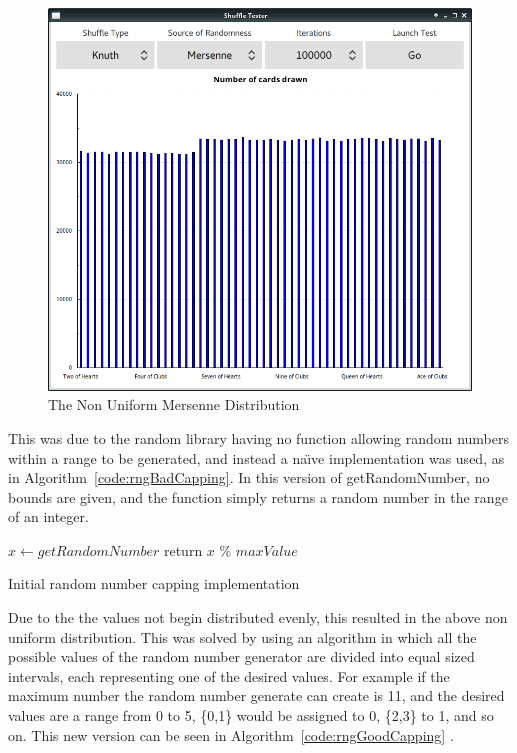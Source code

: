 \begin{figure}[H]
    \centering
    \includegraphics[width=0.8\linewidth]{../images/faultymersenne.png}
    \caption{The Non Uniform Mersenne Distribution}%
    \label{fig:faultymersenne}
\end{figure}

This was due to the random library having no function allowing random numbers
within a range to be generated, and instead a na\"{\i}ve implementation was
used, as in Algorithm~\ref{code:rngBadCapping}. In this version of
getRandomNumber, no bounds are given, and the function simply returns a
random number in the range of an integer.

\vspace{0.3cm}

\begin{algorithm}[H]
    \BlankLine{}
     $x \leftarrow getRandomNumber$\;
     return $x$ \% $maxValue$\;
\caption{Initial random number capping implementation}%
\label{code:rngBadCapping}
\end{algorithm}

\vspace{0.3cm}

Due to the the values not begin distributed evenly, this resulted in the
above non uniform distribution. This was solved by using an algorithm in which
all the possible values of the random number generator are divided into equal
sized intervals, each representing one of the desired values. For example
if the maximum number the random number generate can create is 11, and the
desired values are a range from 0 to 5, \{0,1\} would be assigned to 0, \{2,3\}
to 1, and so on. This new version can be seen in
Algorithm~\ref{code:rngGoodCapping} \parencite{website:reich2011}.

